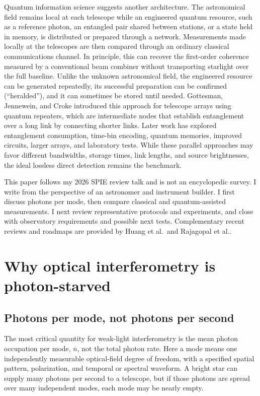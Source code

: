 \documentclass[]{spie}
\newcommand{\nbar}{\overline{n}}
\newcommand{\etal}{et al.}
\begin{document}
Quantum information science suggests another architecture. The astronomical field remains local at each telescope while an engineered quantum resource, such as a reference photon, an entangled pair shared between stations, or a state held in memory, is distributed or prepared through a network. Measurements made locally at the telescopes are then compared through an ordinary classical communications channel. In principle, this can recover the first-order coherence measured by a conventional beam combiner without transporting starlight over the full baseline. Unlike the unknown astronomical field, the engineered resource can be generated repeatedly, its successful preparation can be confirmed (``heralded''), and it can sometimes be stored until needed. Gottesman, Jennewein, and Croke introduced this approach for telescope arrays using quantum repeaters, which are intermediate nodes that establish entanglement over a long link by connecting shorter links.\cite{Gottesman2012} Later work has explored entanglement consumption, time-bin encoding, quantum memories, improved circuits, larger arrays, and laboratory tests.\cite{Khabiboulline2019PRL,Khabiboulline2019PRA,Czupryniak2023,Brown2023,Crawford2023,Stas2026} While these parallel approaches may favor different bandwidths, storage times, link lengths, and source brightnesses, the ideal lossless direct detection remains the benchmark.

This paper follows my 2026 SPIE review talk and is not an encyclopedic survey. I write from the perspective of an astronomer and instrument builder. I first discuss photons per mode, then compare classical and quantum-assisted measurements. I next review representative protocols and experiments, and close with observatory requirements and possible next tests. Complementary recent reviews and roadmaps are provided by Huang \etal\ and Rajagopal \etal\cite{Huang2026,Rajagopal2024}.

\section{Why optical interferometry is photon-starved}
\label{sec:photonstarved}

\subsection{Photons per mode, not photons per second}
The most critical quantity for weak-light interferometry is the mean photon occupation per mode, $\nbar$, not the total photon rate. Here a mode means one independently measurable optical-field degree of freedom, with a specified spatial pattern, polarization, and temporal or spectral waveform. A bright star can supply many photons per second to a telescope, but if those photons are spread over many independent modes, each mode may be nearly empty.
\end{document}

